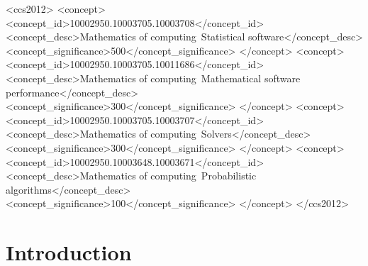 \documentclass[acmsmall]{acmart}
\begin{document}
\begin{CCSXML}
<ccs2012>
   <concept>
       <concept_id>10002950.10003705.10003708</concept_id>
       <concept_desc>Mathematics of computing~Statistical software</concept_desc>
       <concept_significance>500</concept_significance>
       </concept>
   <concept>
       <concept_id>10002950.10003705.10011686</concept_id>
       <concept_desc>Mathematics of computing~Mathematical software performance</concept_desc>
       <concept_significance>300</concept_significance>
       </concept>
   <concept>
       <concept_id>10002950.10003705.10003707</concept_id>
       <concept_desc>Mathematics of computing~Solvers</concept_desc>
       <concept_significance>300</concept_significance>
       </concept>
   <concept>
       <concept_id>10002950.10003648.10003671</concept_id>
       <concept_desc>Mathematics of computing~Probabilistic algorithms</concept_desc>
       <concept_significance>100</concept_significance>
       </concept>
 </ccs2012>
\end{CCSXML}




\maketitle

\section{Introduction}
\end{document}
